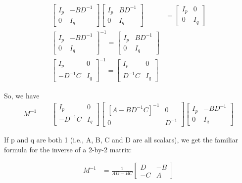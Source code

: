 \begin{align*}
\begin{bmatrix}
		I_{p} & -BD^{-1} \\
		0 & I_{q}
	\end{bmatrix} \begin{bmatrix}
	I_{p} & BD^{-1} \\
0 & I_{q}
\end{bmatrix} &= \begin{bmatrix} 
I_{p} & 0 \\
0 & I_{q}
\end{bmatrix}\\
\begin{bmatrix}
	I_{p} & -BD^{-1} \\
	0 & I_{q}
\end{bmatrix}^{-1} = \begin{bmatrix}
I_{p} & BD^{-1} \\
0 & I_{q}
\end{bmatrix} \\
\begin{bmatrix}
	I_{p} & 0 \\
	-D^{-1}C & I_{q}
\end{bmatrix} ^{-1} = \begin{bmatrix}
I_{p} & 0 \\
D^{-1}C & I_{q}
\end{bmatrix} 
\end{align*}

So, we have
\begin{align*}
	M^{-1} &=   \begin{bmatrix}
		I_{p} & 0 \\
		-D^{-1}C & I_{q}
	\end{bmatrix}   \begin{bmatrix}
		[A - BD^{-1}C]^{-1} & 0 \\
		0 & D^{-1}
	\end{bmatrix}  \begin{bmatrix}
	I_{p} & -BD^{-1} \\
	0 & I_{q}
\end{bmatrix}  
\end{align*}

If p and q are both 1 (i.e., A, B, C and D are all scalars), we get the familiar formula for the inverse of a 2-by-2 matrix:

\begin{align*}
	M^{-1} &= \frac{1}{AD-BC}  \begin{bmatrix}
		D & -B \\
		-C & A
	\end{bmatrix} 
\end{align*}

